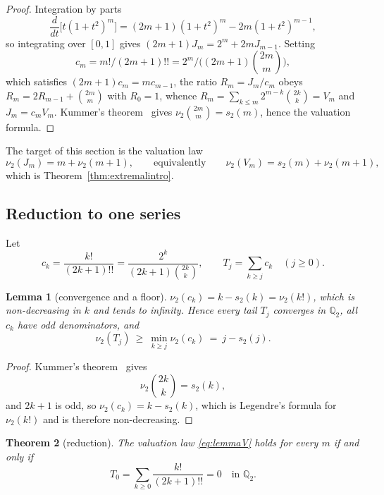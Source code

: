 \documentclass[12pt]{amsart}
\newtheorem{theorem}{Theorem}[section]
\newtheorem{lemma}[theorem]{Lemma}
\theoremstyle{definition}
\theoremstyle{remark}
\newcommand{\Qt}{\mathbb Q_2}
\begin{document}
\begin{proof}
Integration by parts
\[
\frac{d}{dt}\bigl[t(1+t^2)^m\bigr]=(2m+1)(1+t^2)^m-2m(1+t^2)^{m-1}, 
\]
so integrating over $[0,1]$ gives $(2m+1)J_m=2^m+2mJ_{m-1}$.  Setting 
\[
c_m=m!/(2m+1)!!=2^m/\bigl((2m+1)\binom{2m}m\bigr), 
\]
which satisfies $(2m+1)c_m=mc_{m-1}$, the ratio $R_m=J_m/c_m$ obeys $R_m=2R_{m-1}+\binom{2m}m$ with $R_0=1$, whence $R_m=\sum_{k\le m}2^{m-k}\binom{2k}k=V_m$ and $J_m=c_mV_m$.  Kummer's theorem~\cite{Kummer,Mihet,Koblitz} gives $\nu_2\binom{2m}m=s_2(m)$, hence
the valuation formula.
\end{proof}

The target of this section is the valuation law
\begin{equation}\label{eq:lemmaV}
  \nu_2(J_m)=m+\nu_2(m+1),\qquad\text{equivalently}\qquad   \nu_2(V_m)=s_2(m)+\nu_2(m+1),
\end{equation}
which is Theorem~\ref{thm:extremalintro}.

\subsection{Reduction to one series}

Let
\[
  c_k=\frac{k!}{(2k+1)!!}=\frac{2^k}{(2k+1)\binom{2k}k},\qquad
  T_j=\sum_{k\ge j}c_k\quad(j\ge0).
\]

\begin{lemma}[convergence and a floor]\label{lem:conv}
$\nu_2(c_k)=k-s_2(k)=\nu_2(k!)$, which is non-decreasing in $k$ and tends to infinity.  Hence every tail $T_j$ converges in $\Qt$, all $c_k$ have odd
denominators, and
\[
  \nu_2(T_j)\ \ge\ \min_{k\ge j}\nu_2(c_k)\ =\ j-s_2(j).
\]
\end{lemma}

\begin{proof}
Kummer's theorem~\cite{Kummer,Mihet,Koblitz} gives 
\[
\nu_2\binom{2k}k=s_2(k), 
\]
and $2k+1$ is odd, so $\nu_2(c_k)=k-s_2(k)$, which is Legendre's formula for $\nu_2(k!)$ and is therefore non-decreasing.
\end{proof}

\begin{theorem}[reduction]\label{thm:Freduction}
The valuation law \eqref{eq:lemmaV} holds for every $m$ if and only if
\[
  T_0=\sum_{k\ge0}\frac{k!}{(2k+1)!!}=0\quad\text{in }\Qt .
\]
\end{theorem}
\end{document}
